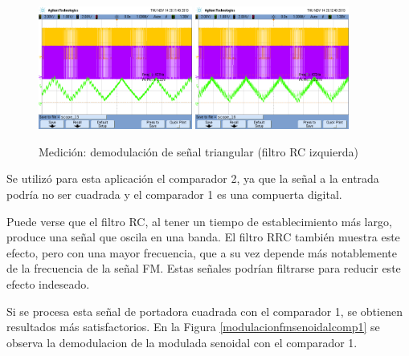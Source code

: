 \begin{figure}[H]
    \centering
    \includegraphics[width=0.45\textwidth]{resources/demodulacionfmtrirc.png}
    \includegraphics[width=0.45\textwidth]{resources/demodulacionfmtrirrc.png}
    \caption{Medición: demodulación de señal triangular (filtro RC izquierda)}
    \label{demodulacionfmtri}
\end{figure}
Se utilizó para esta aplicación el comparador 2, ya que la señal a la entrada podría no ser cuadrada y el comparador 1 es una compuerta digital.

Puede verse que el filtro RC, al tener un tiempo de establecimiento más largo, produce una señal que oscila en una banda. El filtro RRC también muestra este efecto, pero con una mayor frecuencia, que a su vez depende más notablemente de la frecuencia de la señal FM. Estas señales podrían filtrarse para reducir este efecto indeseado.

Si se procesa esta señal de portadora cuadrada con el comparador 1, se obtienen resultados más satisfactorios. En la Figura \ref{modulacionfmsenoidalcomp1} se observa la demodulacion de la modulada senoidal con el comparador 1.

